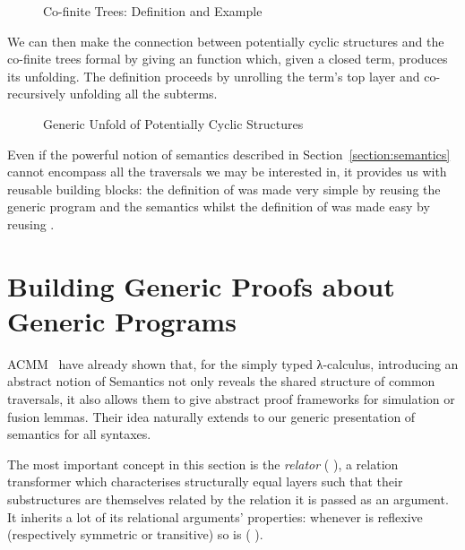\begin{figure}[h]
\begin{minipage}{0.5\textwidth}
\end{minipage}\hfill
\begin{minipage}{0.4\textwidth}
\end{minipage}
\caption{Co-finite Trees: Definition and Example}
\end{figure}

We can then make the connection between potentially cyclic
structures and the co-finite trees formal by giving an 
function which, given a closed term, produces its unfolding.
The definition proceeds by unrolling the term's top layer and
co-recursively unfolding all the subterms.

\begin{figure}[h]
\caption{Generic Unfold of Potentially Cyclic Structures}
\end{figure}

Even if the
powerful notion of semantics described in Section~\ref{section:semantics}
cannot encompass all the traversals we may be interested in,
it provides us with reusable building blocks: the definition
of  was made very simple by reusing the generic
program  and the  semantics whilst
the definition of  was made easy by reusing .



\section{Building Generic Proofs about Generic Programs}

ACMM~\citeyear{allais2017type} have
already shown that, for the simply typed λ-calculus, introducing an abstract
notion of Semantics not only reveals the shared structure of common
traversals, it also allows them to give abstract proof frameworks for
simulation or fusion lemmas. Their idea naturally extends to our generic
presentation of semantics for all syntaxes.

The most important concept in this section is the \emph{relator} (  ),
a relation transformer which characterises structurally equal layers such that their
substructures are themselves related by the relation it is passed as an
argument. It inherits a lot of its relational arguments' properties: whenever
 is reflexive (respectively symmetric or transitive) so is {(   )}.\label{lem:zipstable}


